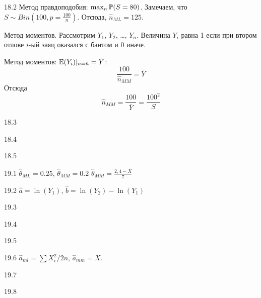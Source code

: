 \protect \hypertarget {soln:18.2}{}
\begin{solution}{{18.2}}
Метод правдоподобия: $\max_n \P(S=80)$. Замечаем, что $S \sim Bin\left(100, p=\frac{100}{n}\right)$. Отсюда, $\hat n_{ML} = 125$.

Метод моментов. Рассмотрим $Y_1$, $Y_2$, \ldots, $Y_n$. Величина $Y_i$ равна 1 если при втором отлове $i$-ый заяц оказался с бантом и 0 иначе.

Метод моментов: $\E(Y_i)|_{n=\hat n}=\bar Y$:
\[
\frac{100}{\hat n_{MM}}=\bar Y
\]
Отсюда
\[
\hat n_{MM} = \frac{100}{\bar Y} = \frac{100^2}{S}
\]
\end{solution}
\protect \hypertarget {soln:18.3}{}
\begin{solution}{{18.3}}
\end{solution}
\protect \hypertarget {soln:18.4}{}
\begin{solution}{{18.4}}
\end{solution}
\protect \hypertarget {soln:18.5}{}
\begin{solution}{{18.5}}
\end{solution}
\protect \hypertarget {soln:19.1}{}
\begin{solution}{{19.1}}
  $\hat{\theta}_{ML}=0.25$, $\hat{\theta}_{MM}=0.2$
  $\hat{\theta}_{MM}=\frac{2{,}4-\bar{X}}{7}$
\end{solution}
\protect \hypertarget {soln:19.2}{}
\begin{solution}{{19.2}}
$\hat{a}=\ln(Y_{1})$, $\hat{b}=\ln(Y_{2})-\ln(Y_{1})$
\end{solution}
\protect \hypertarget {soln:19.3}{}
\begin{solution}{{19.3}}
\end{solution}
\protect \hypertarget {soln:19.4}{}
\begin{solution}{{19.4}}
\end{solution}
\protect \hypertarget {soln:19.5}{}
\begin{solution}{{19.5}}
\end{solution}
\protect \hypertarget {soln:19.6}{}
\begin{solution}{{19.6}}
$\hat{a}_{ml}=\sum X_i^2/2n$, $\hat{a}_{mm}=\bar{X}$.
\end{solution}
\protect \hypertarget {soln:19.7}{}
\begin{solution}{{19.7}}
\end{solution}
\protect \hypertarget {soln:19.8}{}
\begin{solution}{{19.8}}
\end{solution}
\protect \hypertarget {soln:19.9}{}
